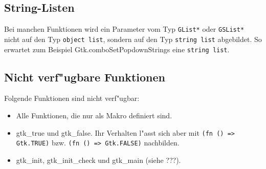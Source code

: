 \documentclass{article}
\begin{document}
\subsection{String-Listen}

Bei manchen Funktionen wird ein Parameter vom Typ \texttt{GList*} oder 
\texttt{GSList*} nicht auf den Typ \texttt{object list}, sondern auf den Typ
\texttt{string list} abgebildet.
So erwartet zum Beispiel Gtk.comboSetPopdownStrings eine \texttt{string list}.

\subsection{Nicht verf"ugbare Funktionen}

Folgende Funktionen sind nicht verf"ugbar:
\begin{itemize}
\item Alle Funktionen, die nur als Makro definiert sind.
\item gtk\_true und gtk\_false. Ihr Verhalten l"asst sich aber mit
      \texttt{(fn () => Gtk.TRUE)} bzw. \texttt{(fn () => Gtk.FALSE)}
      nachbilden.
\item gtk\_init, gtk\_init\_check und gtk\_main (siehe ???).
\end{itemize}
\end{document}
